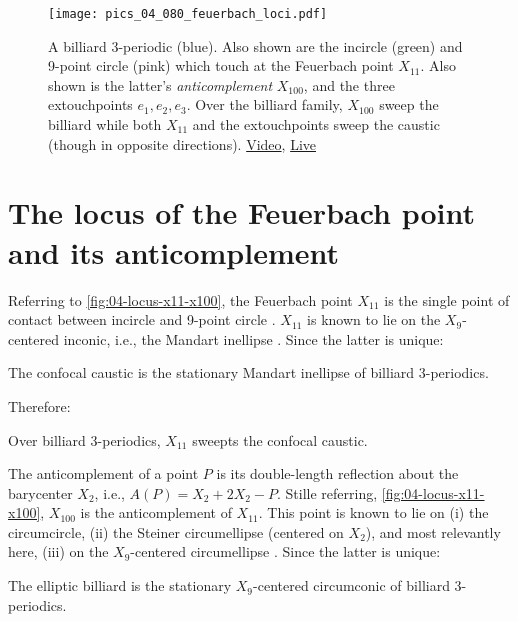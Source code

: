\begin{figure}
    \centering
    \texttt{[image: pics\_04\_080\_feuerbach\_loci.pdf]}
    \caption{A billiard 3-periodic (blue). Also shown are the incircle (green) and 9-point circle (pink) which touch at the Feuerbach point $X_{11}$. Also shown is the latter's {\em anticomplement} $X_{100}$, and the three extouchpoints $e_1,e_2,e_3$. Over the billiard family, $X_{100}$ sweep the billiard while both $X_{11}$ and the extouchpoints sweep the caustic (though in opposite directions).
    \href{https://youtu.be/TXdg7tUl8lc}{Video},
    \label{fig:04-feuer-loci} \href{https://bit.ly/2S2LVqp}{Live}}
\end{figure}

\section{The locus of the Feuerbach point and its anticomplement}
\label{sec:04-x11-x100}

Referring to \cref{fig:04-locus-x11-x100}, the Feuerbach point $X_{11}$ is the single point of contact between incircle and 9-point circle \cite[X(11)]{mw}. $X_{11}$ is known to lie on the $X_{9}$-centered inconic, i.e., the  Mandart inellipse \cite[Mandart inellipse]{mw}. Since the latter is unique:

\begin{observation}
The confocal caustic is the stationary Mandart inellipse of billiard 3-periodics.
\end{observation}

Therefore:

\begin{proposition}
Over billiard 3-periodics, $X_{11}$ sweepts the confocal caustic.
\end{proposition}

The anticomplement of a point $P$ is its double-length reflection about the barycenter $X_2$, i.e., $A(P) = X_2+2 X_2-P$. Stille referring,  \cref{fig:04-locus-x11-x100}, $X_{100}$ is the anticomplement of $X_{11}$. This point is known to lie on (i) the circumcircle, (ii) the Steiner circumellipse (centered on $X_2$), and most relevantly here, (iii) on the $X_9$-centered circumellipse \cite[X(9)]{etc}. Since the latter is unique:

\begin{observation}
The elliptic billiard is the stationary $X_9$-centered circumconic of billiard 3-periodics.
\end{observation}

